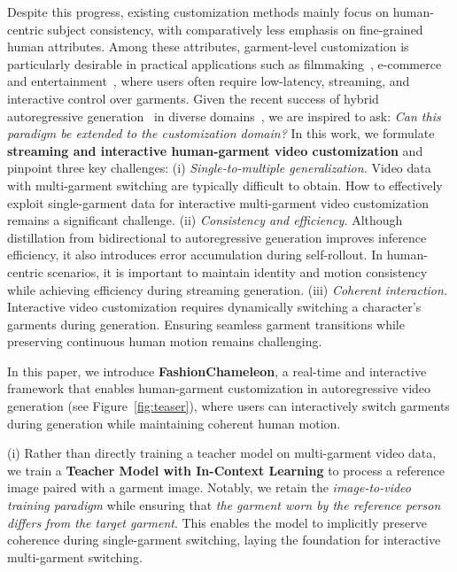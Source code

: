 \documentclass{llmxive}
\providecommand{\method}{FashionChameleon\xspace}
\begin{document}
Despite this progress, existing customization methods mainly focus on human-centric subject consistency, with comparatively less emphasis on fine-grained human attributes.
Among these attributes, garment-level customization is particularly desirable in practical applications such as filmmaking~\cite{wang2024motionctrl,song2025lightmotion}, e-commerce~\cite{lari2022artifical} and entertainment~\cite{li2023photomaker,song2025univst,zhang2025objectadd}, where users often require low-latency, streaming, and interactive control over garments.
% 
Given the recent success of hybrid autoregressive generation~\cite{yin2025slow,huang2025self,zhu2026causal} in diverse domains~\cite{zhuang2025flashvsr,huang2025live,shin2025motionstream}, we are inspired to ask: \textit{Can this paradigm be extended to the customization domain?}
% 
In this work, we formulate \textbf{streaming and interactive human-garment video customization} and pinpoint three key challenges:
%
(i) \textit{Single-to-multiple generalization.}
Video data with multi-garment switching are typically difficult to obtain. How to effectively exploit single-garment data for interactive multi-garment video customization remains a significant challenge.
%
(ii) \textit{Consistency and efficiency.}
%
Although distillation from bidirectional to autoregressive generation improves inference efficiency, it also introduces error accumulation during self-rollout.
In human-centric scenarios, it is important to maintain identity and motion consistency while achieving efficiency during streaming generation.
% 
(iii) \textit{Coherent interaction.}
% 
Interactive video customization requires dynamically switching a character's garments during generation.
Ensuring seamless garment transitions while preserving continuous human motion remains challenging.





In this paper, we introduce \textbf{\method}, a real-time and interactive framework that enables human-garment customization in autoregressive video generation (see Figure~\ref{fig:teaser}), where users can interactively switch garments during generation while maintaining coherent human motion.





(i) Rather than directly training a teacher model on multi-garment video data, we train a \textbf{Teacher Model with In-Context Learning} to process a reference image paired with a garment image.
Notably, we retain the \textit{image-to-video training paradigm} while ensuring that \textit{the garment worn by the reference person differs from the target garment}.
This enables the model to implicitly preserve coherence during single-garment switching, laying the foundation for interactive multi-garment switching.
\end{document}
